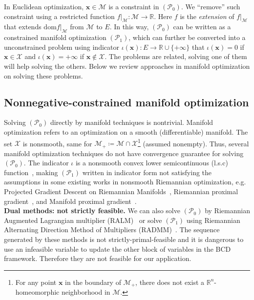 \documentclass[sn-mathphys-num]{sn-jnl}
\def\dom             {\textrm{dom}} 	 %
\def\IR  {\mathbb{R}} 	    %
\def\IRn {\IR^{n}} 			%
\def\x {\bm{x}}
\def\cM { \mathcal{M}}
\def\cP { \mathcal{P}}
\def\cX { \mathcal{X}}
\begin{document}
In Euclidean optimization, $\x \in \cM $ is a constraint in $(\cP_0)$.
We ``remove'' such constraint using a restricted function $f\big|_\cM : \cM \to \IR$.
Here $f$ is the \textit{extension} of $f\big|_\cM$ that extends $\dom f\big|_\cM$ from $\cM$ to $E$.
In this way, $(\cP_0)$ can be written as a constrained manifold optimization $(\cP_1)$, which can further be converted into a unconstrained problem using indicator $\iota(\x) : E \to \IR \cup \{+\infty\}$  that $\iota(\x) = 0$ if $\x \in \cX$ and $\iota(\x) = +\infty$ if $\x \notin \cX$.
The problems are related, solving one of them will help solving the others.
Below we review approaches in manifold optimization on solving these problems.






\subsection{Nonnegative-constrained manifold optimization}\label{sec:tool:subsec:review}
Solving $(\cP_0)$ directly by manifold techniques is nontrivial.
Manifold optimization refers to an optimization on a smooth (differentiable) manifold.
The set $\cX$ is nonsmooth, same for $\cM_+ \coloneqq \cM \cap \cX$\footnote{For any point $\x$ in the boundary of $\cM_+$, there does not exist a $\IRn$-homeomorphic neighborhood in $\cM$.} (assumed nonempty).
Thus, several manifold optimization techniques do not have convergence guarantee for solving $(\cP_0)$.
The indicator $\iota$ is a nonsmooth convex lower semicontinuous (l.s.c) function~\cite{hosseini2017characterization}, making $(\cP_1)$ written in indicator form not satisfying the assumptions in some existing works in nonsmooth Riemannian optimization, e.g. Projected Gradient Descent on Riemannian Manifolds~\cite{hauswirth2016projected},
Riemannian proximal gradient~\cite{huang2022riemannian},
and Manifold proximal gradient~\cite{chen2020proximal}.
\\

\noindent\textbf{Dual methods: not strictly feasible.}
We can also solve $(\cP_0)$ by Riemannian Augmented Lagrangian multiplier (RALM)~\cite{liu2020simple} 
or solve $(\cP_1)$ using Riemannian Alternating Direction Method of Multipliers (RADMM)~\cite{kovnatsky2016madmm}.
The sequence generated by these methods is not strictly-primal-feasible and it is dangerous to use an infeasible variable to update the other block of variables in the BCD framework.
Therefore they are not feasible for our application.
\\
\end{document}
